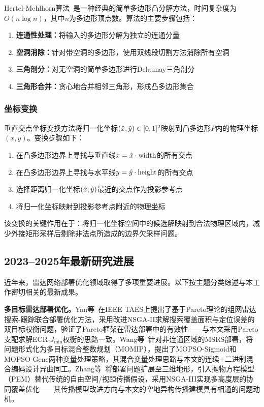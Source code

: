 Hertel-Mehlhorn算法~\cite{Hertel1983}是一种经典的简单多边形凸分解方法，时间复杂度为$O(n \log n)$，其中$n$为多边形顶点数。算法的主要步骤包括：

\begin{enumerate}
    \item \textbf{连通性处理：}将输入的多边形分解为独立的连通分量
    \item \textbf{空洞消除：}针对带空洞的多边形，使用双线段切割方法消除所有空洞
    \item \textbf{三角剖分：}对无空洞的简单多边形进行Delaunay三角剖分
    \item \textbf{三角形合并：}贪心地合并相邻三角形，形成凸多边形集合
\end{enumerate}

\subsubsection{坐标变换}

垂直交点坐标变换方法将归一化坐标$(\hat{x}, \hat{y}) \in [0,1]^2$映射到凸多边形$P$内的物理坐标$(x, y)$。变换步骤如下：

\begin{enumerate}
    \item 在凸多边形边界上寻找与垂直线$x = \hat{x} \cdot \text{width}$的所有交点
    \item 在凸多边形边界上寻找与水平线$y = \hat{y} \cdot \text{height}$的所有交点
    \item 选择距离归一化坐标$(\hat{x}, \hat{y})$最近的交点作为投影参考点
    \item 将归一化坐标映射到投影参考点附近的物理坐标
\end{enumerate}

该变换的关键作用在于：将归一化坐标空间中的候选解映射到合法物理区域内，减少外接矩形采样后剔除非法点所造成的边界欠采样问题。

\subsection{2023--2025年最新研究进展}

近年来，雷达网络部署优化领域取得了多项重要进展。以下按主题分类综述与本工作密切相关的最新成果。

\textbf{多目标雷达部署优化。}Yan等~\cite{Yan2024}在IEEE TAES上提出了基于Pareto理论的组网雷达搜索-跟踪联合部署优化方法，采用改进NSGA-II求解搜索覆盖面积与定位误差的双目标权衡问题，验证了Pareto框架在雷达部署中的有效性——与本文采用Pareto支配求解ECR-$J_{\min}$权衡的思路一致。Wang等~\cite{MSRS2024}针对非连通区域的MSRS部署，将问题形式化为多目标混合整数规划（MOMIP），提出了MOPSO-Sigmoid和MOPSO-Gene两种变量处理策略，其混合变量处理思路与本文的连续+二进制混合编码设计异曲同工。Zhang等~\cite{Radar3D2025}将部署问题扩展至三维地形，引入抛物方程模型（PEM）替代传统的自由空间/视距传播假设，采用NSGA-III实现多高度层的协同覆盖优化——其传播模型改进方向与本文的空地异构传播建模具有相通的问题动机。

